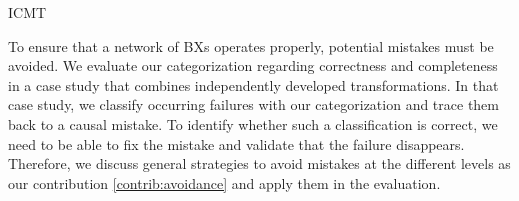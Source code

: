 \begin{copiedFrom}{ICMT}

To ensure that a network of \acp{BX} operates properly, potential mistakes %
must be avoided.
We evaluate our categorization regarding correctness and completeness %
in a case study that combines independently developed transformations.
In that case study, we classify occurring failures with our categorization and trace them back to a causal mistake.
To identify whether such a classification is correct, we need to be able to fix the mistake and validate that the failure disappears.
Therefore, we discuss general strategies to avoid mistakes at the different levels as our contribution \ref{contrib:avoidance} and apply them in the evaluation.


\end{copiedFrom}
